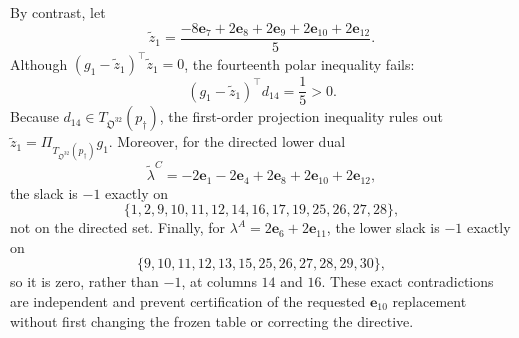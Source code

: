 By contrast, let
\[
\widetilde z_1=\frac{-8\mathbf e_7+2\mathbf e_8+2\mathbf e_9+2\mathbf e_{10}+2\mathbf e_{12}}5.
\]
Although \((g_1-\widetilde z_1)^\top\widetilde z_1=0\), the fourteenth polar inequality fails:
\[
(g_1-\widetilde z_1)^\top d_{14}=\frac15>0.
\]
Because \(d_{14}\in T_{\mathfrak O^{32}}(p_\dagger)\), the first-order projection inequality rules out \(\widetilde z_1=\Pi_{T_{\mathfrak O^{32}}(p_\dagger)}g_1\).  Moreover, for the directed lower dual
\[
\widetilde\lambda^C=-2\mathbf e_1-2\mathbf e_4+2\mathbf e_8+2\mathbf e_{10}+2\mathbf e_{12},
\]
the slack is \(-1\) exactly on
\[
\{1,2,9,10,11,12,14,16,17,19,25,26,27,28\},
\]
not on the directed set.  Finally, for \(\lambda^A=2\mathbf e_6+2\mathbf e_{11}\), the lower slack is \(-1\) exactly on
\[
\{9,10,11,12,13,15,25,26,27,28,29,30\},
\]
so it is zero, rather than \(-1\), at columns \(14\) and \(16\).  These exact contradictions are independent and prevent certification of the requested \(\mathbf e_{10}\) replacement without first changing the frozen table or correcting the directive.
